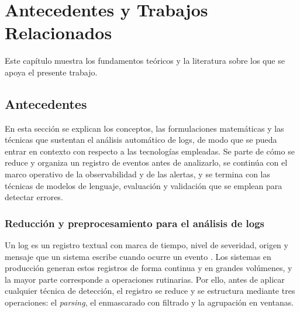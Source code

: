 \chapter{Antecedentes y Trabajos Relacionados} \label{cap:antecedentes}

Este capítulo muestra los fundamentos teóricos y la literatura sobre los que se apoya el presente trabajo.
\section{Antecedentes}\label{sec:antecedentes}

En esta sección se explican los conceptos, las formulaciones matemáticas y las técnicas que sustentan el análisis automático de logs, de modo que se pueda entrar en contexto con respecto a las tecnologías empleadas. Se parte de cómo se reduce y organiza un registro de eventos antes de analizarlo, se continúa con el marco operativo de la observabilidad y de las alertas, y se termina con las técnicas de modelos de lenguaje, evaluación y validación que se emplean para detectar errores.

\subsection{Reducción y preprocesamiento para el análisis de logs}\label{sec:ant_preprocesamiento}

Un log es un registro textual con marca de tiempo, nivel de severidad, origen y mensaje que un sistema escribe cuando ocurre un evento \cite{he2021_survey}. Los sistemas en producción generan estos registros de forma continua y en grandes volúmenes, y la mayor parte corresponde a operaciones rutinarias. Por ello, antes de aplicar cualquier técnica de detección, el registro se reduce y se estructura mediante tres operaciones: el \textit{parsing}, el enmascarado con filtrado y la agrupación en ventanas.

